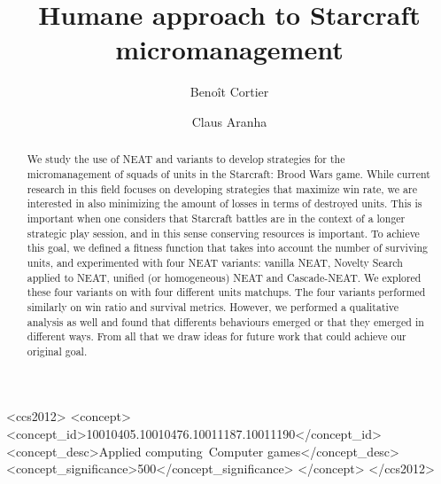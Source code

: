 \documentclass[sigconf, authordraft]{acmart}
\begin{document}
\title{Humane approach to Starcraft micromanagement}

\author{Benoît Cortier}

\author{Claus Aranha}

\begin{abstract}
We study the use of NEAT and variants to develop strategies for the
micromanagement of squads of units in the Starcraft: Brood Wars game.
While current research in this field focuses on developing strategies
that maximize win rate, we are interested in also minimizing the amount
of losses in terms of destroyed units. This is important when one considers
that Starcraft battles are in the context of a longer strategic play session,
and in this sense conserving resources is important. To achieve this goal,
we defined a fitness function that takes into account the number of
surviving units, and experimented with four NEAT variants: vanilla NEAT,
Novelty Search applied to NEAT, unified (or homogeneous) NEAT and Cascade-NEAT. We
explored these four variants on with four different units matchups. The
four variants performed similarly on win ratio and survival metrics.
However, we performed a qualitative analysis as well and found that differents
behaviours emerged or that they emerged in different ways. From all that we draw
ideas for future work that could achieve our original goal.
\end{abstract}

\begin{CCSXML}
<ccs2012>
<concept>
<concept_id>10010405.10010476.10011187.10011190</concept_id>
<concept_desc>Applied computing~Computer games</concept_desc>
<concept_significance>500</concept_significance>
</concept>
</ccs2012>
\end{CCSXML}

\end{document}

